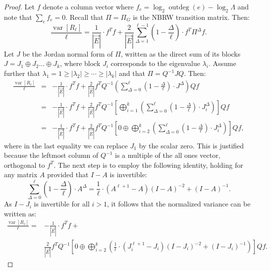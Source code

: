 \documentclass{article}
\newcommand{\dirE}{\vec{E}}
\DeclareMathOperator{\var}{var}
\DeclareMathOperator{\outdeg}{outdeg}
\begin{document}
\begin{proof}
    Let $f$ denote a column vector where $f_e = \log_2 \outdeg(e) - \log_2\Lambda$ and note that $\sum_e f_e = 0$. 
    Recall that $\Pi=\Pi_G$ is the NBRW transition matrix.
    Then:
    \begin{equation}\label{eq:normalized_variance}
        \frac{\var[R_\ell]}{\ell} = \frac{1}{|\dirE|}  \cdot f^T f + \frac{2}{|\dirE|} \sum_{\Delta=1}^{\ell-1} (1-\frac{\Delta}{\ell})  \cdot f^T \Pi^\Delta f.            
    \end{equation}
    Let $J$ be the Jordan normal form of $\Pi$, written as the direct sum of its blocks $J=J_1 \oplus J_2 \ldots \oplus J_k$, 
    where block $J_i$ corresponds to the eigenvalue $\lambda_i$.
    Assume further that $\lambda_1 = 1 \geq |\lambda_2| \geq \cdots \geq |\lambda_k|$ and that $\Pi = Q^{-1} J Q$.
    Then:
    \begin{eqnarray*}
        \frac{\var[R_\ell]}{\ell} 
        &=& - \frac{1}{|\dirE|} \cdot f^T f + \frac{2}{|\dirE|} f^T Q^{-1} \left( \sum_{\Delta=0}^\ell (1-\frac{\Delta}{\ell}) \cdot  J^\Delta  \right) Q f\\
        &=& - \frac{1}{|\dirE|} \cdot f^T f + \frac{2}{|\dirE|} f^T Q^{-1} \left[\bigoplus_{i=1}^k \left( \sum_{\Delta=0}^\ell (1-\frac{\Delta}{\ell}) \cdot  J_i^\Delta  \right) \right] Q f  \\
        &=& - \frac{1}{|\dirE|} \cdot f^T f + \frac{2}{|\dirE|} f^T Q^{-1} \left[0 \oplus \bigoplus_{i=2}^k \left( \sum_{\Delta=0}^\ell (1-\frac{\Delta}{\ell}) \cdot  J_i^\Delta  \right) \right] Q f,  
    \end{eqnarray*}
    where in the last equality  we can replace $J_1$ by the scalar zero. This is justified because the leftmost column of $Q^{-1}$ is a multiple of the all ones vector, orthogonal to $f^T$.
    The next step is to employ the following identity, holding for any matrix $A$ provided that $I-A$ is invertible:
    \begin{equation}\label{eq:matrix_power_sum}
        \sum_{\Delta=0}^\ell (1-\frac{\Delta}{\ell}) \cdot A^\Delta = \frac{1}{\ell} \cdot (A^{\ell+1} - A)(I-A)^{-2} + (I-A)^{-1}.
    \end{equation}
    As $I-J_i$ is invertible for all $i>1$, it follows that the normalized variance can be written as:
    \begin{align}
        \frac{\var[R_\ell]}{\ell} = & -\frac{1}{|\dirE|} \cdot f^T f + \\
        &\frac{2}{|\dirE|} f^T Q^{-1} \left[0 \oplus \bigoplus_{i=2}^k \left( \frac{1}{\ell} \cdot (J_i^{\ell+1} - J_i)(I-J_i)^{-2} + (I-J_i)^{-1} \right) \right] Q f. \nonumber     

\end{align}
\end{proof}
\end{document}
